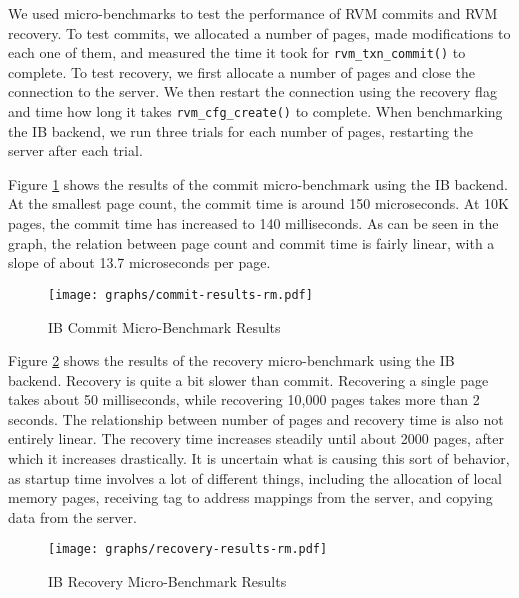 We used micro-benchmarks to test the performance of RVM commits and RVM
recovery. To test commits, we allocated a number of pages, made modifications
to each one of them, and measured the time it took for \verb|rvm_txn_commit()|
to complete. To test recovery, we first allocate a number of pages and
close the connection to the server. We then restart the connection using the
recovery flag and time how long it takes \verb|rvm_cfg_create()| to complete.
When benchmarking the IB backend, we run three trials for each number of pages,
restarting the server after each trial.

Figure \ref{fig:ib-commit-ubm} shows the results of the commit micro-benchmark
using the IB backend. At the smallest page count, the commit time is around
150 microseconds. At 10K pages, the commit time has increased to 140 milliseconds.
As can be seen in the graph, the relation between page count and commit time
is fairly linear, with a slope of about 13.7 microseconds per page.

\begin{figure}[h]
    \caption{IB Commit Micro-Benchmark Results}
    \texttt{[image: graphs/commit-results-rm.pdf]}
    \label{fig:ib-commit-ubm}
\end{figure}

Figure \ref{fig:ib-recovery-ubm} shows the results of the recovery
micro-benchmark using the IB backend. Recovery is quite a bit slower than
commit. Recovering a single page takes about 50 milliseconds, while recovering
10,000 pages takes more than 2 seconds. The relationship between number of
pages and recovery time is also not entirely linear.
The recovery time increases steadily until about 2000 pages, after which it
increases drastically. It is uncertain what is causing this sort of behavior,
as startup time involves a lot of different things, including the allocation
of local memory pages, receiving tag to address mappings from the server, and
copying data from the server.

\begin{figure}[h]
    \caption{IB Recovery Micro-Benchmark Results}
    \texttt{[image: graphs/recovery-results-rm.pdf]}
    \label{fig:ib-recovery-ubm}
\end{figure}
